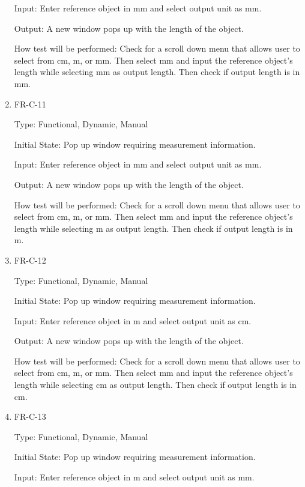 \documentclass[12pt, titlepage]{article}
\begin{document}
\begin{enumerate}
					Input: Enter reference object in mm and select output unit as mm.
					
					Output: A new window pops up with the length of the object.
					
					How test will be performed: Check for a scroll down menu that allows user to select from cm, m, or mm. Then select mm and input the reference object's length while selecting mm as output length. Then check if output length is in mm.
				
				\item{FR-C-11\\}
					
					Type: Functional, Dynamic, Manual
					
					Initial State: Pop up window requiring measurement information.
					
					Input: Enter reference object in mm and select output unit as mm.
					
					Output: A new window pops up with the length of the object.
					
					How test will be performed: Check for a scroll down menu that allows user to select from cm, m, or mm. Then select mm and input the reference object's length while selecting m as output length. Then check if output length is in m.
					
				\item{FR-C-12\\}
					
					Type: Functional, Dynamic, Manual
					
					Initial State: Pop up window requiring measurement information.
					
					Input: Enter reference object in m and select output unit as cm.
					
					Output: A new window pops up with the length of the object.
					
					How test will be performed: Check for a scroll down menu that allows user to select from cm, m, or mm. Then select mm and input the reference object's length while selecting cm as output length. Then check if output length is in cm.
					
					\item{FR-C-13\\}
					
					Type: Functional, Dynamic, Manual
					
					Initial State: Pop up window requiring measurement information.
					
					Input: Enter reference object in m and select output unit as mm.
					

\end{enumerate}
\end{document}

